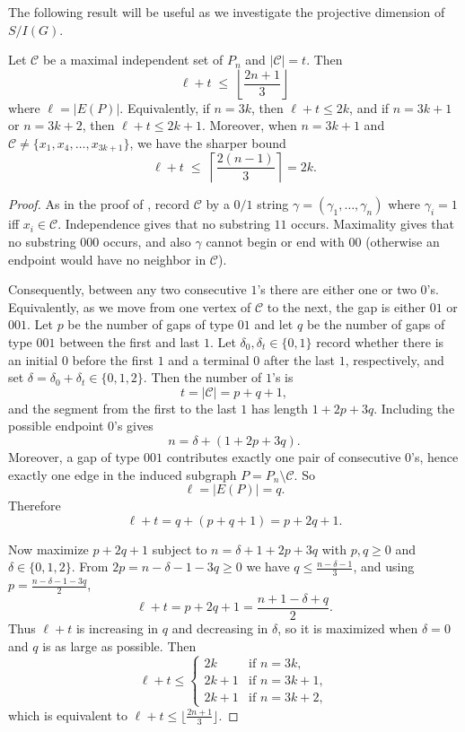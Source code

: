 \documentclass[12pt]{amsart}
\theoremstyle{plain}
\theoremstyle{definition}
\begin{document}
The following result will be useful as we investigate the projective dimension of $S/I(G)$. 

\begin{prop}\label{prop:ell-plus-C}
Let  $\mathcal{C}$  be a maximal independent set of $P_n$ and $ |\mathcal{C}|=t$. Then
\[
\ell + t \;\le\; \left\lfloor \frac{2n+1}{3} \right\rfloor
\]
where $\ell = |E(P)|$. Equivalently, if $n=3k$, then $\ell+t\le 2k$, and if $n=3k+1$ or $n=3k+2$, then
$\ell+t \le 2k+1$. Moreover, when $n=3k+1$ and $\mathcal{C} \neq \{x_1,x_4,\dots,x_{3k+1}\}$,
we have the sharper bound
\[
\ell + t \;\le\; \left\lceil \frac{2(n-1)}{3} \right\rceil = 2k.
\]
\end{prop}

\begin{proof}
As in the proof of , record $\mathcal{C}$ by a $0/1$ string $\gamma=(\gamma_1,\dots,\gamma_n)$ where $\gamma_i=1$ iff $x_i\in \mathcal{C}$.
Independence gives that no substring $11$ occurs. Maximality gives that no substring $000$ occurs, and
also $\gamma$ cannot begin or end with $00$ (otherwise an endpoint would have no neighbor in $\mathcal{C}$).

Consequently, between any two consecutive $1$'s there are either one or two $0$'s.  Equivalently, as we
move from one vertex of $\mathcal{C}$ to the next, the gap is either $01$ or $001$. Let $p$ be the number of gaps
of type $01$ and let $q$ be the number of gaps of type $001$ between the first and last $1$. Let
$\delta_0,\delta_t\in\{0,1\}$ record whether there is an initial $0$ before the first $1$ and a terminal $0$
after the last $1$, respectively, and set $\delta=\delta_0+\delta_t\in\{0,1,2\}$. Then the number of $1$'s is
\[
t=| \mathcal{C}|=p+q+1,
\]
and the segment from the first to the last $1$ has length $1+2p+3q$. Including the possible endpoint
$0$'s gives
\[
n=\delta+(1+2p+3q).
\]
Moreover, a gap of type $001$ contributes exactly one pair of consecutive $0$'s, hence exactly one edge
in the induced subgraph $P=P_n\setminus  \mathcal{C}$. So
\[
\ell=|E(P)|=q.
\]
Therefore
\[
\ell+t = q+(p+q+1)=p+2q+1.
\]

Now maximize $p+2q+1$ subject to $n=\delta+1+2p+3q$ with $p,q\ge 0$ and $\delta\in\{0,1,2\}$.
From $2p=n-\delta-1-3q\ge 0$ we have $q\le \frac{n-\delta-1}{3}$, and using $p=\frac{n-\delta-1-3q}{2}$,
\[
\ell+t=p+2q+1=\frac{n+1-\delta+q}{2}.
\]
Thus $\ell+t$ is increasing in $q$ and decreasing in $\delta$, so it is maximized when $\delta=0$ and $q$
is as large as possible. Then
\[
\ell+t \le
\begin{cases}
2k & \text{if } n=3k,\\
2k+1 & \text{if } n=3k+1,\\
2k+1 & \text{if } n=3k+2,
\end{cases}
\]
which is equivalent to $\ell+t\le \big\lfloor\frac{2n+1}{3}\big\rfloor$.


\end{proof}
\end{document}
